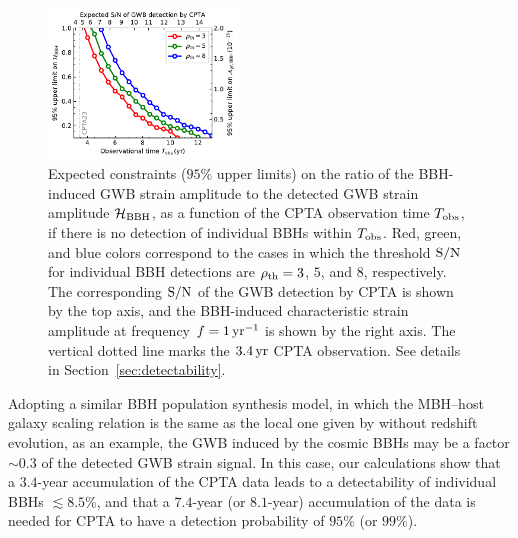 \documentclass[twocolumn]{aastex631}
\newcommand{\calH}{{\mathcal{H}}}
\newcommand{\obs}{_{\rm obs}}
\newcommand{\snr}{{\rm S/N}}
\newcommand{\rhoth}{{\rho_{\rm th}}}
\newcommand{\yr}{{\rm\,yr}}
\newcommand{\iyr}{{\rm\,yr^{-1}}}
\begin{document}
\begin{figure}[!htb]
%
\centering
%
\includegraphics[width=0.45\textwidth]{f5.pdf}
%
\caption{Expected constraints ($95\%$ upper limits) on the ratio of the 
BBH-induced GWB strain amplitude to the detected GWB strain amplitude
$\calH_{\rm BBH}$, as a function of the CPTA observation time $T\obs$, if there
is no detection of individual BBHs within $T\obs$. Red, green, and blue colors
correspond to the cases in which the threshold $\snr$ for individual BBH
detections are $\rhoth=3$, $5$, and $8$, respectively. The corresponding $\snr$
of the GWB detection by CPTA is shown by the top axis, and the BBH-induced
characteristic strain amplitude at frequency $f=1\iyr$ is shown by the right
axis. The vertical dotted line marks the $3.4\yr$ CPTA observation. See details
in Section~\ref{sec:detectability}.}
%
\label{fig:LoudFraction}
%
\end{figure}

Adopting a similar BBH population
synthesis model, in which the MBH--host galaxy scaling relation is the same as
the local one given by \citet{KH13} without redshift evolution, as an example,
the GWB induced by the cosmic BBHs may be a factor $\sim 0.3$ of the
detected GWB strain signal. In this case, our calculations show that a $3.4$-year accumulation of the CPTA
data leads to a detectability of individual BBHs $\lesssim 8.5\%$, and that a
$7.4$-year (or $8.1$-year) accumulation of the data is needed for CPTA to have a
detection probability of $95\%$ (or $99\%$).
\end{document}
